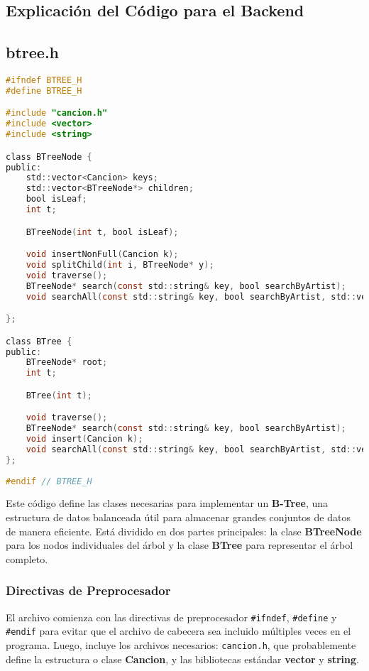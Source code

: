 \documentclass[12pt]{article}
\begin{document}
\begin{flushleft}
        \section{Explicación del Código para el Backend}
            \subsection{btree.h}
            
            \begin{lstlisting}[language=C, style=mystyle, caption={Cabecera de un Árbol B}]
#ifndef BTREE_H
#define BTREE_H

#include "cancion.h"
#include <vector>
#include <string>

class BTreeNode {
public:
    std::vector<Cancion> keys;
    std::vector<BTreeNode*> children;
    bool isLeaf;
    int t;

    BTreeNode(int t, bool isLeaf);

    void insertNonFull(Cancion k);
    void splitChild(int i, BTreeNode* y);
    void traverse();
    BTreeNode* search(const std::string& key, bool searchByArtist);
    void searchAll(const std::string& key, bool searchByArtist, std::vector<Cancion>& result);

};

class BTree {
public:
    BTreeNode* root;
    int t;

    BTree(int t);

    void traverse();
    BTreeNode* search(const std::string& key, bool searchByArtist);
    void insert(Cancion k);
    void searchAll(const std::string& key, bool searchByArtist, std::vector<Cancion>& result); 
};
    
#endif // BTREE_H
            \end{lstlisting}

            \noindent\hspace*{4em}Este código define las clases necesarias para implementar un \textbf{B-Tree}, una estructura de datos balanceada útil para almacenar grandes conjuntos de datos de manera eficiente. Está dividido en dos partes principales: la clase \textbf{BTreeNode} para los nodos individuales del árbol y la clase \textbf{BTree} para representar el árbol completo.
            
            \subsubsection{Directivas de Preprocesador}
                \noindent\hspace*{4em}El archivo comienza con las directivas de preprocesador \verb|#ifndef|, \verb|#define| y \verb|#endif| para evitar que el archivo de cabecera sea incluido múltiples veces en el programa. Luego, incluye los archivos necesarios: \verb|cancion.h|, que probablemente define la estructura o clase \textbf{Cancion}, y las bibliotecas estándar \textbf{vector} y \textbf{string}.
            

\end{flushleft}
\end{document}
